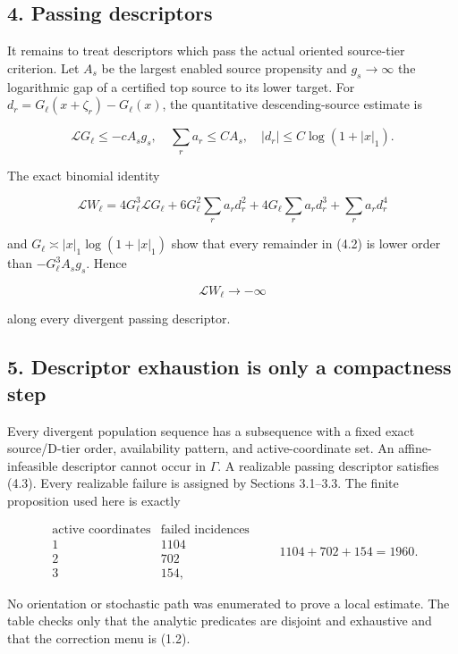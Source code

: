 \subsection{4. Passing descriptors}

It remains to treat descriptors which pass the actual oriented
source-tier criterion. Let \(A_s\) be the largest enabled source
propensity and \(g_s\to\infty\) the logarithmic gap of a certified top
source to its lower target. For \(d_r=G_\ell(x+\zeta_r)-G_\ell(x)\), the
quantitative descending-source estimate is

\[
 \mathcal LG_\ell\le-cA_sg_s,
 \quad \sum_r a_r\le CA_s,
 \quad |d_r|\le C\log(1+|x|_1).                     \tag{4.1}
\]

The exact binomial identity

\[
 \mathcal LW_\ell
 =4G_\ell^3\mathcal LG_\ell
  +6G_\ell^2\sum_ra_rd_r^2
  +4G_\ell\sum_ra_rd_r^3+
    \sum_ra_rd_r^4                                  \tag{4.2}
\]

and \(G_\ell\asymp |x|_1\log(1+|x|_1)\) show that every remainder in
(4.2) is lower order than \(-G_\ell^3A_sg_s\). Hence

\[
                         \mathcal LW_\ell\longrightarrow-\infty          \tag{4.3}
\]

along every divergent passing descriptor.

\subsection{5. Descriptor exhaustion is only a compactness
step}

Every divergent population sequence has a subsequence with a fixed exact
source/D-tier order, availability pattern, and active-coordinate set. An
affine-infeasible descriptor cannot occur in \(\Gamma\). A realizable
passing descriptor satisfies (4.3). Every realizable failure is assigned
by Sections 3.1--3.3. The finite proposition used here is exactly

\[
\begin{array}{c|r}
\text{active coordinates}&\text{failed incidences}\\ \hline
1&1104\\2&702\\3&154,
\end{array}
\qquad 1104+702+154=1960.                            \tag{5.1}
\]

No orientation or stochastic path was enumerated to prove a local
estimate. The table checks only that the analytic predicates are
disjoint and exhaustive and that the correction menu is (1.2).

